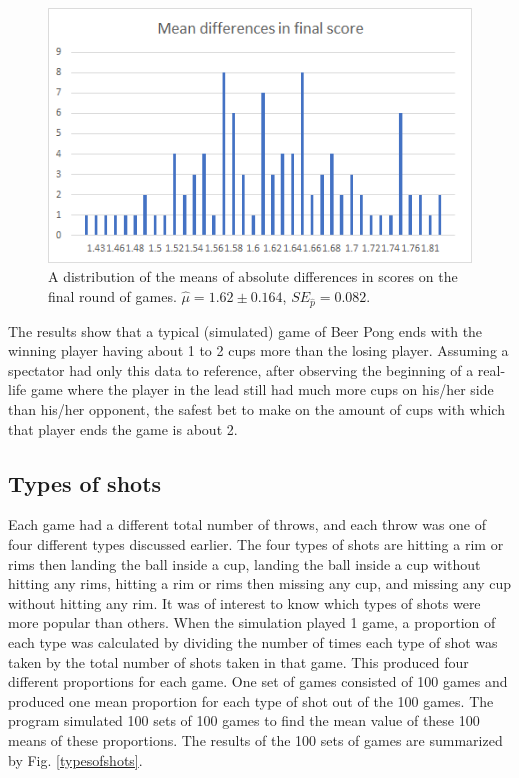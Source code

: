 \documentclass{article}
\begin{document}
\begin{figure}
	\centering
	\includegraphics[width=0.7\linewidth]{finalscores}
	\caption{A distribution of the means of absolute differences in scores on the final round of games. $\hat{\mu} = 1.62 \pm 0.164$, $SE_{\hat{p}} = 0.082$.}
	\label{finalscores}
\end{figure}

The results show that a typical (simulated) game of Beer Pong ends with the winning player having about 1 to 2 cups more than the losing player. Assuming a spectator had only this data to reference, after observing the beginning of a real-life game where the player in the lead still had much more cups on his/her side than his/her opponent, the safest bet to make on the amount of cups with which that player ends the game is about 2.

\subsection{Types of shots}

Each game had a different total number of throws, and each throw was one of four different types discussed earlier. The four types of shots are hitting a rim or rims then landing the ball inside a cup, landing the ball inside a cup without hitting any rims, hitting a rim or rims then missing any cup, and missing any cup without hitting any rim. It was of interest to know which types of shots were more popular than others. When the simulation played 1 game, a proportion of each type was calculated by dividing the number of times each type of shot was taken by the total number of shots taken in that game. This produced four different proportions for each game. One set of games consisted of 100 games and produced one mean proportion for each type of shot out of the 100 games. The program simulated 100 sets of 100 games to find the mean value of these 100 means of these proportions. The results of the 100 sets of games are summarized by Fig. \ref{typesofshots}.
\end{document}
